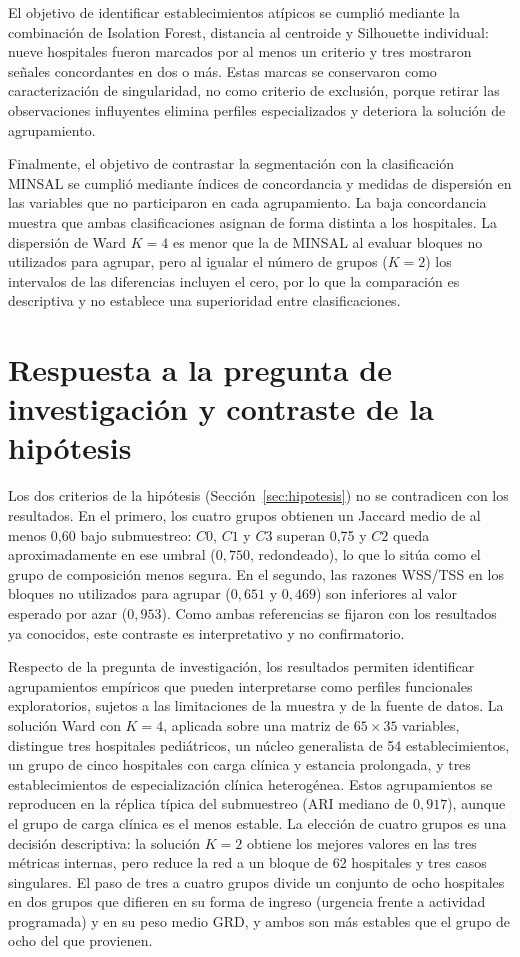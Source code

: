 El objetivo de identificar establecimientos atípicos se cumplió mediante la
combinación de Isolation Forest, distancia al centroide y Silhouette individual:
nueve hospitales fueron marcados por al menos un criterio y tres mostraron
señales concordantes en dos o más. Estas marcas se conservaron como
caracterización de singularidad, no como criterio de exclusión, porque retirar
las observaciones influyentes elimina perfiles especializados y deteriora la
solución de agrupamiento.

Finalmente, el objetivo de contrastar la segmentación con la clasificación
MINSAL se cumplió mediante índices de concordancia y medidas de dispersión en
las variables que no participaron en cada agrupamiento. La baja concordancia
muestra que ambas clasificaciones asignan de forma distinta a los hospitales.
La dispersión de Ward $K=4$ es menor que la de MINSAL al evaluar bloques no
utilizados para agrupar, pero al igualar el número de grupos ($K=2$) los
intervalos de las diferencias incluyen el cero, por lo que la comparación es
descriptiva y no establece una superioridad entre clasificaciones.

\section{Respuesta a la pregunta de investigación y contraste de la hipótesis}

Los dos criterios de la hipótesis (Sección~\ref{sec:hipotesis}) no se
contradicen con los resultados. En el primero, los cuatro grupos obtienen un
Jaccard medio de al menos 0,60 bajo submuestreo: $C0$, $C1$ y $C3$ superan
0,75 y $C2$ queda aproximadamente en ese umbral ($0{,}750$, redondeado),
lo que lo sitúa como el
grupo de composición menos segura. En el segundo, las razones WSS/TSS en los
bloques no utilizados para agrupar ($0{,}651$ y $0{,}469$) son inferiores al
valor esperado por azar ($0{,}953$). Como ambas referencias se fijaron con los
resultados ya conocidos, este contraste es interpretativo y no confirmatorio.

Respecto de la pregunta de investigación, los resultados permiten identificar
agrupamientos empíricos que pueden interpretarse como perfiles funcionales
exploratorios, sujetos a las limitaciones de la muestra y de la fuente de datos.
La solución Ward con $K=4$, aplicada sobre una matriz de $65 \times 35$
variables, distingue tres hospitales pediátricos, un núcleo generalista de 54
establecimientos, un grupo de cinco hospitales con carga clínica y estancia
prolongada, y tres establecimientos de especialización clínica heterogénea.
Estos agrupamientos se reproducen en la réplica típica del submuestreo (ARI
mediano de $0{,}917$), aunque el grupo de carga clínica es el menos estable.
La elección de cuatro grupos es una decisión descriptiva: la solución $K=2$
obtiene los mejores valores en las tres métricas internas, pero reduce la red a
un bloque de 62 hospitales y tres casos singulares. El paso de tres a cuatro
grupos divide un conjunto de ocho hospitales en dos grupos que difieren en su
forma de ingreso (urgencia frente a actividad programada) y en su peso medio
GRD, y ambos son más estables que el grupo de ocho del que provienen.

